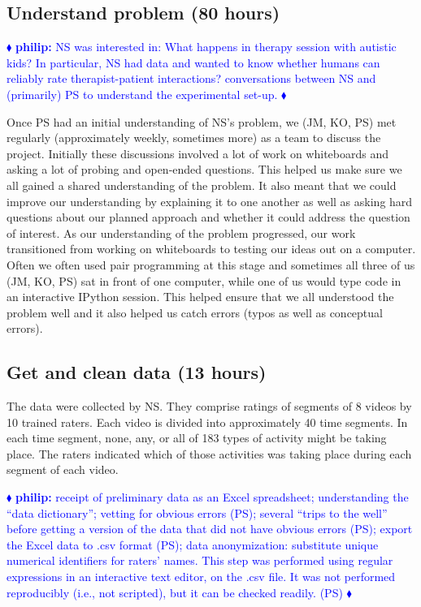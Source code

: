 \documentclass[]{article}
\newcommand{\philip}[1] { \textcolor{blue} {
\ensuremath{\blacklozenge} {\bf philip:}  {#1}
\ensuremath{\blacklozenge} } }
\begin{document}
\subsection{Understand problem (80 hours)}

\philip{
NS was interested in:  What happens in therapy session with autistic kids?
In particular, NS had data and wanted to know whether humans can reliably rate
therapist-patient interactions?
conversations between NS and (primarily) PS to understand the experimental
set-up.
}

Once PS had an initial understanding of NS's problem, we (JM, KO, PS) met
regularly (approximately weekly, sometimes more) as a team to discuss the
project.
Initially these discussions involved a lot of work on whiteboards and asking a
lot of probing and open-ended questions.
This helped us make sure we all gained a shared understanding of the problem.
It also meant that we could improve our understanding by explaining it to one
another as well as asking hard questions about our planned approach and whether
it could address the question of interest.
As our understanding of the problem progressed, our work transitioned from
working on whiteboards to testing our ideas out on a computer.
Often we often used pair programming at this stage and sometimes all three of
us (JM, KO, PS) sat in front of one computer, while one of us would type code
in an interactive IPython session.
This helped ensure that we all understood the problem well and it also helped
us catch errors (typos as well as conceptual errors).

\subsection{Get and clean data (13 hours)}

The data were collected by NS.
They comprise ratings of segments of 8 videos by 10 trained raters.
Each video is divided into approximately 40 time segments.
In each time segment, none, any, or all of 183 types of activity might be
taking place.
The raters indicated which of those activities was taking place during each
segment of each video.

\philip{
receipt of preliminary data as an Excel spreadsheet; understanding the ``data
dictionary''; vetting for obvious errors (PS);
several ``trips to the well'' before getting a version of the data that did not
have obvious errors (PS);
export the Excel data to .csv format (PS);
data anonymization: substitute unique numerical identifiers for raters' names. 
This step was performed using regular expressions in an interactive text
editor, on the .csv file.
It was not performed reproducibly (i.e., not scripted), but it can be checked
readily. (PS) 
}
\end{document}
